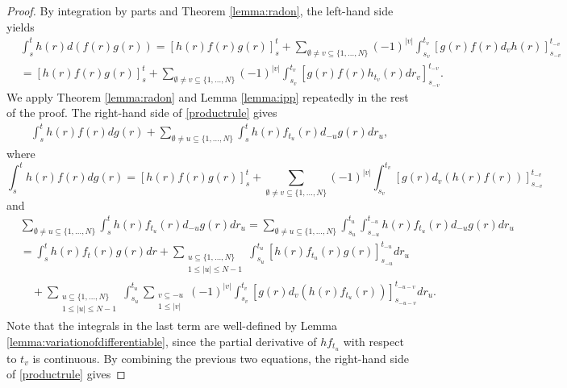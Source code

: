 \documentclass[10pt,a4paper]{amsart}
\begin{document}
\begin{proof}
By integration by parts and Theorem \ref{lemma:radon}, the left-hand side yields
\begin{equation*}
\begin{split}
&\int_s^t h(r) d(f(r)g(r)) = [h(r)f(r)g(r)]_s^t + \sum_{\emptyset\neq v \subseteq \{1,\dots,N\}}(-1)^{|v|} \int_{s_v}^{t_v} [g(r)f(r)d_vh(r)]_{s_{-v}}^{t_{-v}}\\
&= [h(r)f(r)g(r)]_s^t +\sum_{\emptyset\neq v\subseteq \{1,\dots,N\}}(-1)^{|v|} \int_{s_v}^{t_v} [g(r)f(r)h_{t_v}(r)dr_v]_{s_{-v}}^{t_{-v}}.
 \end{split}
\end{equation*}
We apply Theorem \ref{lemma:radon} and Lemma \ref{lemma:ipp} repeatedly in the rest of the proof.
The right-hand side of \eqref{productrule} gives
\begin{equation*}
\begin{split}
\int_s^t h(r)f(r) dg(r) +  \sum_{\emptyset\neq u\subseteq \{1,\dots,N\}}\int_s^t  h(r)f_{t_u}(r) d_{-u}g(r) dr_u,
\end{split}
\end{equation*}
where
\begin{equation*}
\int_s^t h(r)f(r) dg(r) = [h(r)f(r)g(r)]_s^t + \sum_{\emptyset\neq v \subseteq \{1,\dots,N\}}(-1)^{|v|} \int_{s_v}^{t_v} [g(r)d_v(h(r)f(r))]_{s_{-v}}^{t_{-v}}
\end{equation*}
and
\begin{equation*}
\begin{split}
&\sum_{\emptyset\neq u\subseteq \{1,\dots,N\}}\int_s^t  h(r)f_{t_u}(r) d_{-u}g(r) dr_u = \sum_{\emptyset\neq u\subseteq \{1,\dots,N\}}\int_{s_u}^{t_u} \int_{s_{-u}}^{t_{-u}} h(r)f_{t_u}(r) d_{-u}g(r) dr_u \\
&=\int_{s}^{t} h(r)f_t(r)g(r) dr + \sum_{\substack{u\subseteq\{1,\dots,N\}\\
1 \leq |u|\leq N-1}} \int_{s_u}^{t_u} [h(r)f_{t_u}(r)g(r)]_{s_{-u}}^{t_{-u}} dr_u\\
&\quad+ \sum_{\substack{u\subseteq\{1,\dots,N\}\\
1 \leq |u|\leq N-1}}\int_{s_u}^{t_u} \sum_{\substack{v\subseteq -u\\ 1\leq |v|}} (-1)^{|v|} \int_{s_v}^{t_v} [g(r) d_v(h(r)f_{t_u}(r))]_{s_{-u-v}}^{t_{-u-v}} dr_u.
\end{split}
\end{equation*}
Note that the integrals in the last term are well-defined by Lemma \ref{lemma:variationofdifferentiable}, since the partial derivative of $hf_{t_u}$ with respect to $t_v$ is continuous. By combining the previous two equations, the right-hand side of \eqref{productrule} gives

\end{proof}
\end{document}
